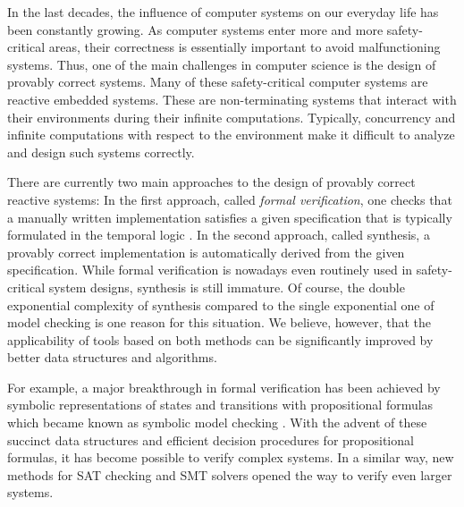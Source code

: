\documentclass[submission,copyright,creativecommons]{eptcs}
\begin{document}
In the last decades, the influence of computer systems on our everyday life has been constantly growing. As computer systems enter more and more safety-critical areas, their correctness is essentially important to avoid malfunctioning systems. Thus, one of the main challenges in computer science is the design of provably correct systems. Many of these safety-critical computer systems are reactive embedded systems. These are non-terminating systems that interact with their environments during their infinite computations. Typically, concurrency and infinite computations with respect to the environment make it difficult to analyze and design such systems correctly.

There are currently two main approaches to the design of provably correct reactive systems: In the first approach, called \emph{formal verification}, one checks that a manually written implementation satisfies a given specification that is typically formulated in the temporal logic \LTL{} \cite{Pnue77a,Emer90}. In the second approach, called \LTL{} synthesis, a provably correct implementation is automatically derived from the given \LTL{} specification. While formal verification is nowadays even routinely used in safety-critical system designs, \LTL{} synthesis is still immature. Of course, the double exponential complexity of \LTL{} synthesis compared to the single exponential one of \LTL{} model checking is one reason for this situation. We believe, however, that the applicability of tools based on both methods can be significantly improved by better data structures and algorithms.

For example, a major breakthrough in formal verification has been achieved by symbolic representations of states and transitions with propositional formulas which became known as symbolic model checking \cite{BCMD90}. With the advent of these succinct data structures and efficient decision procedures for propositional formulas, it has become possible to verify complex systems. In a similar way, new methods for SAT checking and SMT solvers opened the way to verify even larger systems.
\end{document}
